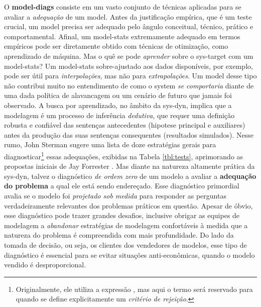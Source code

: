 \documentclass[./main.tex]{subfiles}
\begin{document}
\par O \textbf{\gls{model-diags}} consiste em um vasto conjunto de técnicas aplicadas para se avaliar a \textit{adequação} de um \gls{model}. Antes da justificação empírica, que é um teste crucial, um \gls{model} precisa ser adequado pelo ângulo conceitual, técnico, prático e comportamental. Afinal, um \gls{model-stats} extremamente adequado em termos empíricos pode ser diretamente obtido com técnicas de otimização, como aprendizado de máquina. Mas o quê se pode \textit{aprender} sobre o \gls{sys-target} com um \gls{model-stats}? Um \gls{model-stats} sobre-ajustado aos dados disponíveis, por exemplo, pode ser útil para \textit{interpolações}, mas não para \textit{extrapolações}. Um \gls{model} desse tipo não contribui muito no entendimento de como o \gls{system} \textit{se comportaria} diante de uma dada política de alavancagem ou um cenário de futuro que jamais foi observado. A busca por aprendizado, no âmbito da \gls{sys-dyn}, implica que a modelagem é um processo de inferência \textit{dedutiva}, que requer uma definição robusta e confiável das sentenças antecedentes (\gls{hipotese} principal e auxiliares) antes da produção das suas sentenças consequentes (resultados simulados). Nesse rumo, John Sterman sugere uma lista de doze estratégias gerais para diagnosticar\footnote{Originalmente, ele utiliza a expressão , mas aqui o termo  será reservado para quando se define explicitamente um \textit{critério de rejeição}. } essas adequações, exibidas na Tabela \ref{tbl:tests}, aprimorando as propostas iniciais de Jay Forrester \cite{sterman2000}. Mas diante na natureza altamente prática da \gls{sys-dyn}, talvez o diagnóstico \textit{de ordem zero} de um modelo a avaliar a \textbf{adequação do problema} a qual ele está sendo endereçado. Esse diagnóstico primordial avalia se o modelo foi \textit{projetado sob medida} para responder as perguntas verdadeiramente relevantes dos problemas práticos em questão. Apesar de óbvio, esse diagnóstico pode trazer grandes desafios, inclusive obrigar as equipes de modelagem a \textit{abandonar} estratégias de modelagem confortáveis à medida que a natureza do problema é compreendida com mais profundidade. Do lado da tomada de decisão, ou seja, os clientes dos vendedores de modelos, esse tipo de diagnóstico é essencial para se evitar situações anti-econômicas, quando o modelo vendido é desproporcional.  
\end{document}

